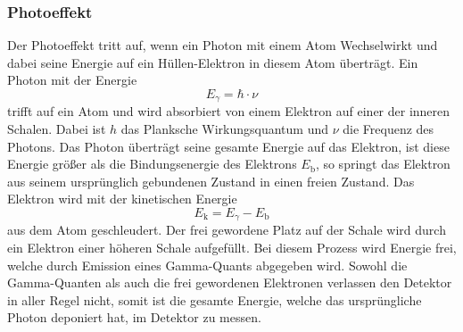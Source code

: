 \subsubsection{Photoeffekt}
Der Photoeffekt tritt auf, wenn ein Photon mit einem Atom Wechselwirkt und dabei seine Energie auf ein Hüllen-Elektron in diesem Atom 
überträgt. Ein Photon mit der Energie 
\begin{equation}
     E_{\gamma} = \hbar \cdot \nu 
\end{equation} 
trifft auf ein Atom und wird absorbiert von einem Elektron auf einer der inneren Schalen.
Dabei ist \( h \) das Planksche Wirkungsquantum und $\nu$ die Frequenz des Photons.
Das Photon überträgt seine gesamte Energie auf das Elektron, ist diese Energie größer als die Bindungsenergie des Elektrons $E_\text{b}$, so springt das 
Elektron aus seinem ursprünglich gebundenen Zustand in einen freien Zustand. Das Elektron wird mit der kinetischen Energie 
\begin{equation}
    E_\text{k}=E_{\gamma}-E_\text{b} 
\end{equation} 
aus dem Atom geschleudert. Der frei gewordene Platz auf der Schale wird durch ein Elektron einer höheren Schale aufgefüllt. Bei diesem Prozess wird Energie frei, 
welche durch Emission eines Gamma-Quants abgegeben wird. Sowohl die Gamma-Quanten als auch die frei gewordenen Elektronen verlassen den Detektor in aller Regel nicht,
somit ist die gesamte Energie, welche das ursprüngliche Photon deponiert hat, im Detektor zu messen.
\cite{Strahlung_Arten}


